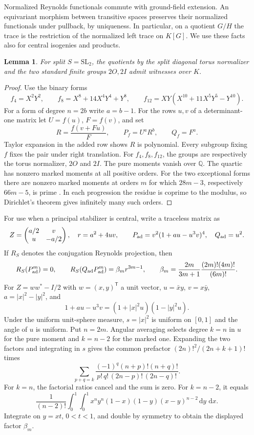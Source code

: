 \documentclass[11pt]{article}
\newtheorem{lemma}[theorem]{Lemma}
\newcommand{\QQ}{\mathbb Q}
\newcommand{\SL}{\mathrm{SL}}
\newcommand{\dd}{\,\mathrm d}
\begin{document}
Normalized Reynolds functionals commute with ground-field extension.
An equivariant morphism between transitive spaces preserves their
normalized functionals under pullback, by uniqueness. In particular,
on a quotient \(G/H\) the trace is the restriction of the normalized
left trace on \(K[G]\). We use these facts also for central isogenies
and products.

\begin{lemma}\label{lem:splitrank}
For split \(S=\SL_2\), the quotients by the split diagonal torus
normalizer and the two standard finite groups \(2O,2I\) admit
witnesses over \(K\).
\end{lemma}

\begin{proof}
Use the binary forms
\[
 f_4=X^2Y^2,\qquad
 f_8=X^8+14X^4Y^4+Y^8,\qquad
 f_{12}=XY(X^{10}+11X^5Y^5-Y^{10}).
\]
For a form of degree \(n=2b\) write \(a=b-1\). For the rows \(u,v\)
of a determinant-one matrix let \(U=f(u)\), \(F=f(v)\), and set
\[
 R=\frac{f(v+Fu)}{F},\qquad P_f=U^aR^b,\qquad Q_f=F^a.
\]
Taylor expansion in the added row shows \(R\) is polynomial. Every
subgroup fixing \(f\) fixes the pair under right translation.
For \(f_4,f_8,f_{12}\), the groups are respectively the torus
normalizer, \(2O\) and \(2I\). The pure moments vanish over \(\QQ\).
The quartic has nonzero marked moments at all positive orders.
For the two exceptional forms there are nonzero marked moments at
orders \(m\) for which \(28m-3\), respectively \(66m-5\), is prime
\cite[Theorem~1.2 and Lemma~5.1]{Complex}. In each progression the
residue is coprime to the modulus, so Dirichlet's theorem gives
infinitely many such orders.

\end{proof}

For use when a principal stabilizer is central, write a traceless
matrix as
\[
 Z=\begin{pmatrix}a/2&v\\u&-a/2\end{pmatrix},\quad r=a^2+4uv,
 \qquad P_{\rm ad}=v^2(1+au-u^3v)^4,\quad Q_{\rm ad}=u^2 .
\]
If \(R_S\) denotes the conjugation Reynolds projection, then
\begin{equation}\label{eq:adjoint}
 R_S(P_{\rm ad}^m)=0,\qquad
 R_S(Q_{\rm ad}P_{\rm ad}^m)=\beta_m r^{3m-1},\qquad
 \beta_m=\frac{2m}{3m+1}\frac{(2m)!(4m)!}{(6m)!}.
\end{equation}
For \(Z=ww^*-I/2\) with \(w=(x,y)^{\mathsf T}\) a unit vector,
\(u=\bar x y\), \(v=x\bar y\), \(a=|x|^2-|y|^2\), and
\[
                1+au-u^3v=(1+|x|^2u)(1-|y|^2u).
\]
Under the uniform unit-sphere measure, \(s=|x|^2\) is uniform
on \([0,1]\) and the angle of \(u\) is uniform. Put \(n=2m\).
Angular averaging selects degree \(k=n\) in \(u\) for the pure
moment and \(k=n-2\) for the marked one. Expanding the two factors
and integrating in \(s\) gives the common prefactor
\((2n)!^2/(2n+k+1)!\) times
\[
 \sum_{p+q=k}\frac{(-1)^q(n+p)!(n+q)!}
 {p!\,q!\,(2n-p)!\,(2n-q)!}.
\]
For \(k=n\), the factorial ratios cancel and the sum is zero.
For \(k=n-2\), it equals
\[
 \frac{1}{(n-2)!}\int_0^1\!\int_0^1
 x^ny^n(1-x)(1-y)(x-y)^{n-2}\dd y\,\dd x .
\]
Integrate on \(y=xt\), \(0<t<1\), and double by symmetry to
obtain the displayed factor \(\beta_m\).
\end{document}
